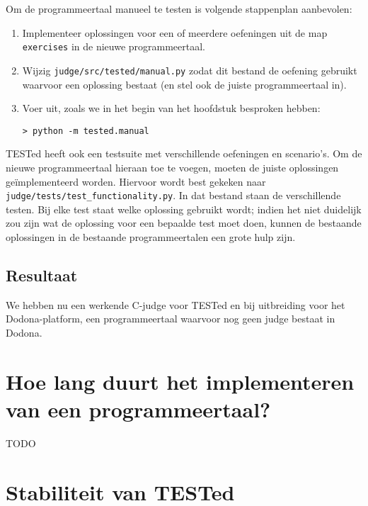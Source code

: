 \inputminted[firstline=17,lastline=23]{python}{sources/languages-init.py}

Om de programmeertaal manueel te testen is volgende stappenplan aanbevolen:

\begin{enumerate}
    \item Implementeer oplossingen voor een of meerdere oefeningen uit de map \texttt{exercises} in de nieuwe programmeertaal.
    \item Wijzig \texttt{judge/src/tested/manual.py} zodat dit bestand de oefening gebruikt waarvoor een oplossing bestaat (en stel ook de juiste programmeertaal in).
    \item Voer uit, zoals we in het begin van het hoofdstuk besproken hebben:
    
    \begin{verbatim}
> python -m tested.manual
    \end{verbatim}
\end{enumerate}

TESTed heeft ook een testsuite met verschillende oefeningen en scenario's.
Om de nieuwe programmeertaal hieraan toe te voegen, moeten de juiste oplossingen geïmplementeerd worden.
Hiervoor wordt best gekeken naar \texttt{judge/tests/test\_functionality.py}.
In dat bestand staan de verschillende testen.
Bij elke test staat welke oplossing gebruikt wordt;
indien het niet duidelijk zou zijn wat de oplossing voor een bepaalde test moet doen, kunnen de bestaande oplossingen in de bestaande programmeertalen een grote hulp zijn.

\subsection{Resultaat}\label{subsec:resultaat}

We hebben nu een werkende C-judge voor TESTed en bij uitbreiding voor het Dodona-platform, een programmeertaal waarvoor nog geen judge bestaat in Dodona.


\section{Hoe lang duurt het implementeren van een programmeertaal?}\label{sec:hoe-lang-duurt-het-implementeren-van-een-programmeertaal?}

TODO

\section{Stabiliteit van TESTed}\label{sec:stabiliteit-van-tested}

